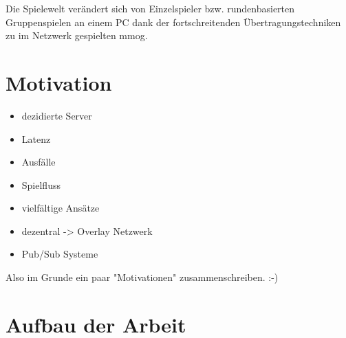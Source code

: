 Die Spielewelt verändert sich von Einzelspieler bzw. rundenbasierten Gruppenspielen an einem PC dank der fortschreitenden Übertragungstechniken zu im Netzwerk gespielten \ac{mmog}.

\cite{Triebel2008Peertopeer} %

\section{Motivation}
\begin{itemize}
\item dezidierte Server
\item Latenz
\item Ausfälle
\item Spielfluss
\end{itemize}

\begin{itemize}
\item vielfältige Ansätze \cite{Bharambe2008Donnybrook} %
\item dezentral -> Overlay Netzwerk
\item Pub/Sub Systeme \cite{Knutsson2004Peertopeer} %
\end{itemize}

Also im Grunde ein paar "Motivationen" zusammenschreiben. :-)

\section{Aufbau der Arbeit}

